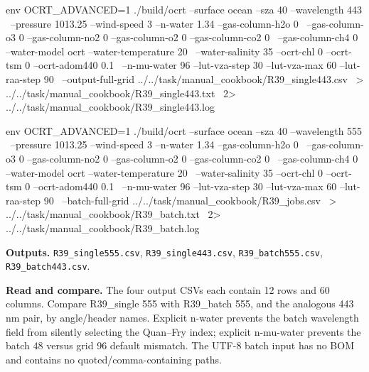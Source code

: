 \noindent\begin{minipage}{\linewidth}
\begin{ManualCode}

env OCRT_ADVANCED=1 ./build/ocrt --surface ocean --sza 40 --wavelength 443 \
  --pressure 1013.25 --wind-speed 3 --n-water 1.34 --gas-column-h2o 0 \
  --gas-column-o3 0 --gas-column-no2 0 --gas-column-o2 0 --gas-column-co2 0 \
  --gas-column-ch4 0 --water-model ocrt --water-temperature 20 \
  --water-salinity 35 --ocrt-chl 0 --ocrt-tsm 0 --ocrt-adom440 0.1 \
  --n-mu-water 96 --lut-vza-step 30 --lut-vza-max 60 --lut-raa-step 90 \
  --output-full-grid ../../task/manual_cookbook/R39_single443.csv \
  > ../../task/manual_cookbook/R39_single443.txt \
  2> ../../task/manual_cookbook/R39_single443.log

\end{ManualCode}
\end{minipage}\par

\noindent\begin{minipage}{\linewidth}
\begin{ManualCode}

env OCRT_ADVANCED=1 ./build/ocrt --surface ocean --sza 40 --wavelength 555 \
  --pressure 1013.25 --wind-speed 3 --n-water 1.34 --gas-column-h2o 0 \
  --gas-column-o3 0 --gas-column-no2 0 --gas-column-o2 0 --gas-column-co2 0 \
  --gas-column-ch4 0 --water-model ocrt --water-temperature 20 \
  --water-salinity 35 --ocrt-chl 0 --ocrt-tsm 0 --ocrt-adom440 0.1 \
  --n-mu-water 96 --lut-vza-step 30 --lut-vza-max 60 --lut-raa-step 90 \
  --batch-full-grid ../../task/manual_cookbook/R39_jobs.csv \
  > ../../task/manual_cookbook/R39_batch.txt \
  2> ../../task/manual_cookbook/R39_batch.log

\end{ManualCode}
\end{minipage}\par

\textbf{Outputs. }\texttt{R39\_\allowbreak{}single555.csv}, \texttt{R39\_\allowbreak{}single443.csv}, \texttt{R39\_\allowbreak{}batch555.csv}, \texttt{R39\_\allowbreak{}batch443.csv}.

\textbf{Read and compare. }The four output CSVs each contain 12 rows and 60 columns. Compare R39\_single 555 with R39\_batch 555, and the analogous 443 nm pair, by angle/header names. Explicit n-water prevents the batch wavelength field from silently selecting the Quan–Fry index; explicit n-mu-water prevents the batch 48 versus grid 96 default mismatch. The UTF-8 batch input has no BOM and contains no quoted/comma-containing paths.


